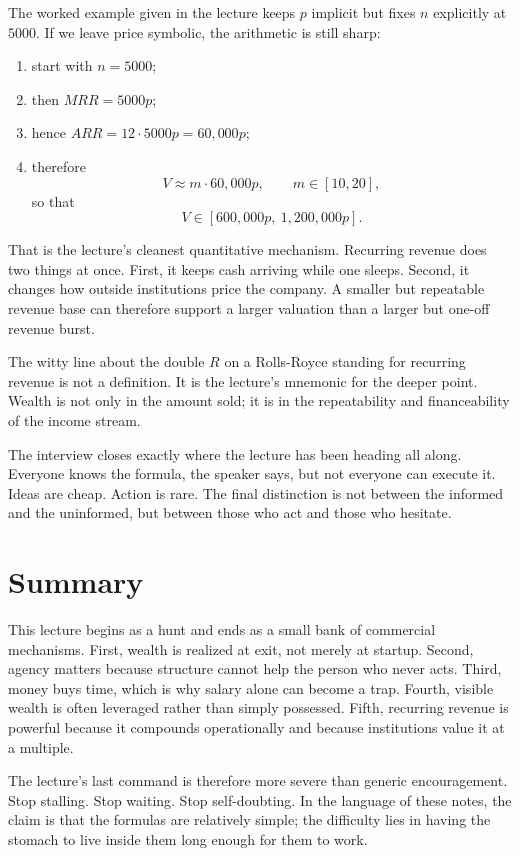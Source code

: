 The worked example given in the lecture keeps \(p\) implicit but fixes \(n\) explicitly at \(5000\). If we leave price symbolic, the arithmetic is still sharp:
\begin{enumerate}
\item start with \(n=5000\);
\item then \(MRR = 5000p\);
\item hence \(ARR = 12 \cdot 5000p = 60{,}000p\);
\item therefore
\[
V \approx m \cdot 60{,}000p,
\qquad m \in [10,20],
\]
so that
\[
V \in [600{,}000p,\ 1{,}200{,}000p].
\]
\end{enumerate}

That is the lecture's cleanest quantitative mechanism. Recurring revenue does two things at once. First, it keeps cash arriving while one sleeps. Second, it changes how outside institutions price the company. A smaller but repeatable revenue base can therefore support a larger valuation than a larger but one-off revenue burst.

The witty line about the double \(R\) on a Rolls-Royce standing for recurring revenue is not a definition. It is the lecture's mnemonic for the deeper point. Wealth is not only in the amount sold; it is in the repeatability and financeability of the income stream.

The interview closes exactly where the lecture has been heading all along. Everyone knows the formula, the speaker says, but not everyone can execute it. Ideas are cheap. Action is rare. The final distinction is not between the informed and the uninformed, but between those who act and those who hesitate.

\section{Summary}

This lecture begins as a hunt and ends as a small bank of commercial mechanisms. First, wealth is realized at exit, not merely at startup. Second, agency matters because structure cannot help the person who never acts. Third, money buys time, which is why salary alone can become a trap. Fourth, visible wealth is often leveraged rather than simply possessed. Fifth, recurring revenue is powerful because it compounds operationally and because institutions value it at a multiple.

The lecture's last command is therefore more severe than generic encouragement. Stop stalling. Stop waiting. Stop self-doubting. In the language of these notes, the claim is that the formulas are relatively simple; the difficulty lies in having the stomach to live inside them long enough for them to work.